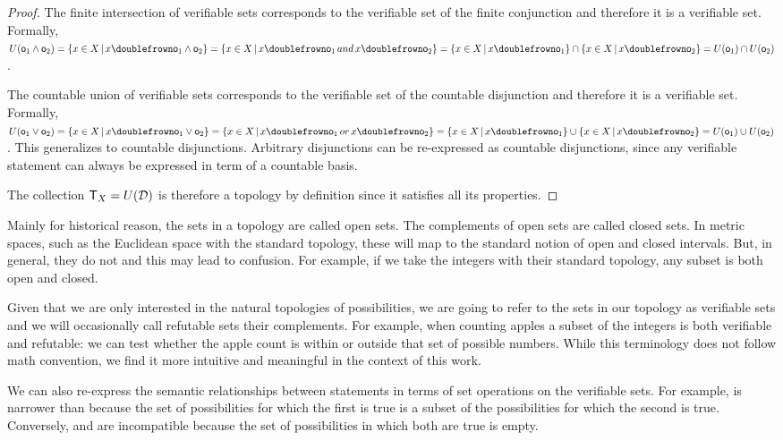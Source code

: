 \documentclass[11pt,letterpaper,fleqn]{memoir} %
\begin{document}
\begin{mathSection}
\begin{proof}
	The finite intersection of verifiable sets corresponds to the verifiable set of the finite conjunction and therefore it is a verifiable set. Formally, $U(\obs_1\AND\obs_2) = \{ x \in X \, | \, x \comp \obs_1\AND\obs_2\} =  \{ x \in X \, | \, x \comp \obs_1 \, and \, x \comp \obs_2\} = \{ x \in X \, | \, x \comp \obs_1\} \cap \{ x \in X \, | \, x \comp \obs_2\} = U(\obs_1) \cap U(\obs_2)$.

	The countable union of verifiable sets corresponds to the verifiable set of the countable disjunction and therefore it is a verifiable set. Formally, $U(\obs_1\OR\obs_2) = \{ x \in X \, | \, x \comp \obs_1\OR\obs_2\} =  \{ x \in X \, | \, x \comp \obs_1 \, or \, x \comp \obs_2\} = \{ x \in X \, | \, x \comp \obs_1\} \cup \{ x \in X \, | \, x \comp \obs_2\} = U(\obs_1) \cup U(\obs_2)$. This generalizes to countable disjunctions. Arbitrary disjunctions can be re-expressed as countable disjunctions, since any verifiable statement can always be expressed in term of a countable basis.

	The collection $\mathsf{T}_X=U(\mathcal{D})$ is therefore a topology by definition since it satisfies all its properties.
\end{proof}
\end{mathSection}

Mainly for historical reason, the sets in a topology are called open sets. The complements of open sets are called closed sets. In metric spaces, such as the Euclidean space with the standard topology, these will map to the standard notion of open and closed intervals. But, in general, they do not and this may lead to confusion. For example, if we take the integers with their standard topology, any subset is both open and closed.

Given that we are only interested in the natural topologies of possibilities, we are going to refer to the sets in our topology as verifiable sets and we will occasionally call refutable sets their complements. For example, when counting apples a subset of the integers is both verifiable and refutable: we can test whether the apple count is within or outside that set of possible numbers. While this terminology does not follow math convention, we find it more intuitive and meaningful in the context of this work.

We can also re-express the semantic relationships between statements in terms of set operations on the verifiable sets. For example,  is narrower than  because the set of possibilities for which the first is true is a subset of the possibilities for which the second is true. Conversely,  and  are incompatible because the set of possibilities in which both are true is empty.
\end{document}
